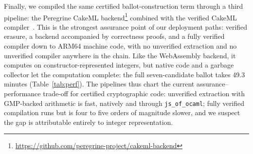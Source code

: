 Finally, we compiled the same certified ballot-construction term through a third pipeline: the Peregrine CakeML backend\footnote{\url{https://github.com/peregrine-project/cakeml-backend}} combined with the verified CakeML compiler~\cite{10.1145/2535838.2535841}. This is the strongest assurance point of our deployment paths: verified erasure, a backend accompanied by correctness proofs, and a fully verified compiler down to ARM64 machine code, with no unverified extraction and no unverified compiler anywhere in the chain. Like the WebAssembly backend, it computes on constructor-represented integers, but native code and a garbage collector let the computation complete: the full seven-candidate ballot takes 49.3 minutes (Table~\ref{tab:perf}). The pipelines thus chart the current assurance--performance trade-off for certified cryptographic code: unverified extraction with GMP-backed arithmetic is fast, natively and through \texttt{js\_of\_ocaml}; fully verified compilation runs but is four to five orders of magnitude slower, and we suspect the gap is attributable entirely to integer representation. 



